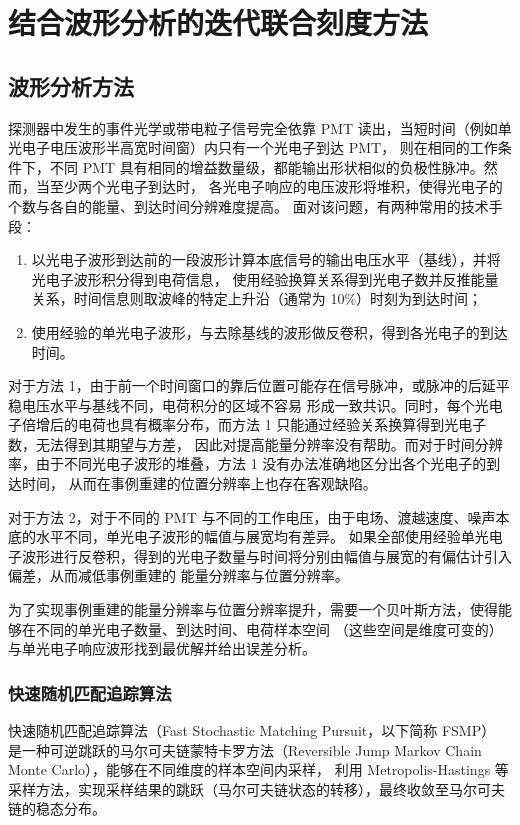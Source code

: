 
\chapter{结合波形分析的迭代联合刻度方法}

\section{波形分析方法}
探测器中发生的事件光学或带电粒子信号完全依靠 PMT 读出，当短时间（例如单光电子电压波形半高宽时间窗）内只有一个光电子到达 PMT，
则在相同的工作条件下，不同 PMT 具有相同的增益数量级，都能输出形状相似的负极性脉冲。然而，当至少两个光电子到达时，
各光电子响应的电压波形将堆积，使得光电子的个数与各自的能量、到达时间分辨难度提高。
面对该问题，有两种常用的技术手段：
\begin{enumerate}
    \item 以光电子波形到达前的一段波形计算本底信号的输出电压水平（基线），并将光电子波形积分得到电荷信息，
    使用经验换算关系得到光电子数并反推能量关系，时间信息则取波峰的特定上升沿（通常为 10\%）时刻为到达时间；
    \item 使用经验的单光电子波形，与去除基线的波形做反卷积，得到各光电子的到达时间。
\end{enumerate}

对于方法 1，由于前一个时间窗口的靠后位置可能存在信号脉冲，或脉冲的后延平稳电压水平与基线不同，电荷积分的区域不容易
形成一致共识。同时，每个光电子倍增后的电荷也具有概率分布，而方法 1 只能通过经验关系换算得到光电子数，无法得到其期望与方差，
因此对提高能量分辨率没有帮助。而对于时间分辨率，由于不同光电子波形的堆叠，方法 1 没有办法准确地区分出各个光电子的到达时间，
从而在事例重建的位置分辨率上也存在客观缺陷。

对于方法 2，对于不同的 PMT 与不同的工作电压，由于电场、渡越速度、噪声本底的水平不同，单光电子波形的幅值与展宽均有差异。
如果全部使用经验单光电子波形进行反卷积，得到的光电子数量与时间将分别由幅值与展宽的有偏估计引入偏差，从而减低事例重建的
能量分辨率与位置分辨率。

为了实现事例重建的能量分辨率与位置分辨率提升，需要一个贝叶斯方法，使得能够在不同的单光电子数量、到达时间、电荷样本空间
（这些空间是维度可变的）与单光电子响应波形找到最优解并给出误差分析。
\subsection{快速随机匹配追踪算法}
快速随机匹配追踪算法（Fast Stochastic Matching Pursuit，以下简称 FSMP）\cite{wangFastStochasticMatching2024a}
是一种可逆跳跃的马尔可夫链蒙特卡罗方法（Reversible Jump Markov Chain Monte Carlo），能够在不同维度的样本空间内采样，
利用 Metropolis-Hastings 等采样方法，实现采样结果的跳跃（马尔可夫链状态的转移），最终收敛至马尔可夫链的稳态分布。


